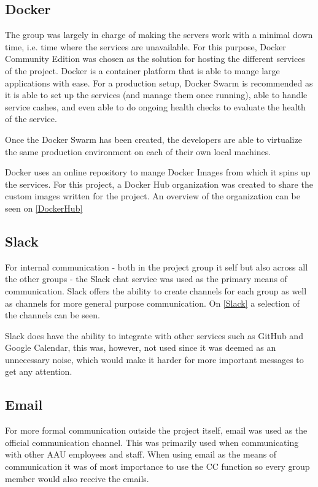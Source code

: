 

\subsection{Docker}
The group was largely in charge of making the servers work with a minimal down time, i.e. time where the services are unavailable.
For this purpose, Docker Community Edition was chosen as the solution for hosting the different services of the project.
Docker is a container platform that is able to mange large applications with ease.
For a production setup, Docker Swarm is recommended as it is able to set up the services (and manage them once running), able to handle service cashes, and even able to do ongoing health checks to evaluate the health of the service.

Once the Docker Swarm has been created, the developers are able to virtualize the same production environment on each of their own local machines.

Docker uses an online repository to mange Docker Images from which it spins up the services.
For this project, a Docker Hub organization was created to share the custom images written for the project.
An overview of the organization can be seen on \autoref{DockerHub}


\subsection{Slack}
For internal communication - both in the project group it self but also across all the other groups - the Slack chat service was used as the primary means of communication.
Slack offers the ability to create channels for each group as well as channels for more general purpose communication.
On \autoref{Slack} a selection of the channels can be seen.


Slack does have the ability to integrate with other services such as GitHub and Google Calendar, this was, however, not used since it was deemed as an unnecessary noise, which would make it harder for more important messages to get any attention.

\subsection{Email}
For more formal communication outside the project itself, email was used as the official communication channel. 
This was primarily used when communicating with other AAU employees and staff.
When using email as the means of communication it was of most importance to use the CC function so every group member would also receive the emails.
